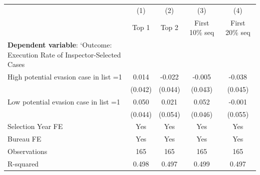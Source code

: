 {
\def\sym#1{\ifmmode^{#1}\else\(^{#1}\)\fi}
\begin{tabular}{l*{4}{c}}
\toprule
            &\multicolumn{1}{c}{(1)}&\multicolumn{1}{c}{(2)}&\multicolumn{1}{c}{(3)}&\multicolumn{1}{c}{(4)}\\
            &\multicolumn{1}{c}{Top 1}&\multicolumn{1}{c}{Top 2}&\multicolumn{1}{c}{First 10\% seq}&\multicolumn{1}{c}{First 20\% seq}\\
\midrule
\textbf{Dependent variable}: `Outcome: Execution Rate of Inspector-Selected Cases&                     &                     &                     &                     \\
\addlinespace
High potential evasion case in list =1&       0.014         &      -0.022         &      -0.005         &      -0.038         \\
            &     (0.042)         &     (0.044)         &     (0.043)         &     (0.045)         \\
\addlinespace
Low potential evasion case in list =1&       0.050         &       0.021         &       0.052         &      -0.001         \\
            &     (0.044)         &     (0.054)         &     (0.046)         &     (0.055)         \\
\midrule
Selection Year FE&         Yes         &         Yes         &         Yes         &         Yes         \\
Bureau FE   &         Yes         &         Yes         &         Yes         &         Yes         \\
Observations&         165         &         165         &         165         &         165         \\
R-squared   &       0.498         &       0.497         &       0.499         &       0.497         \\
\bottomrule
\end{tabular}
}

